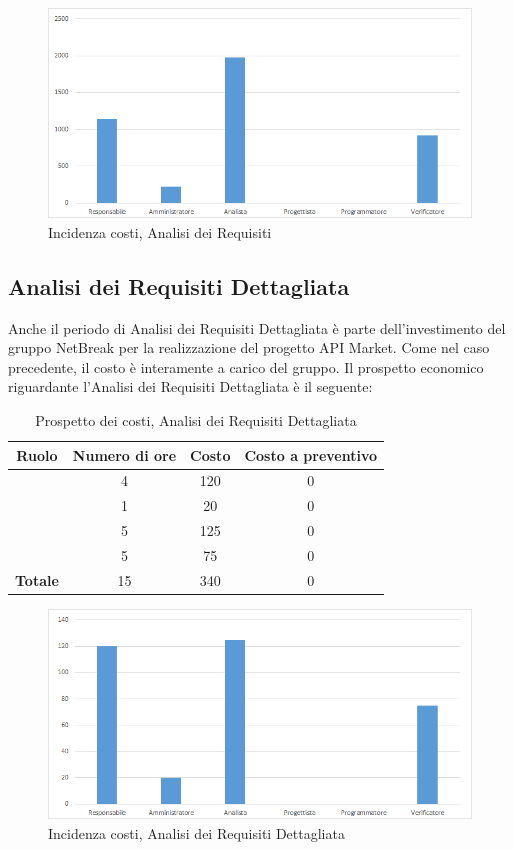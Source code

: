 \begin{figure}[H]
	\centering
	\includegraphics[scale=0.6]{img/8-1.png}
	\caption{Incidenza costi, Analisi dei Requisiti}
\end{figure}

\subsection{Analisi dei Requisiti Dettagliata}
Anche il periodo di Analisi dei Requisiti Dettagliata è parte dell'investimento del gruppo NetBreak per la realizzazione del progetto API Market. Come nel caso precedente, il costo è interamente a carico del gruppo. Il prospetto economico riguardante l'Analisi dei Requisiti Dettagliata è il seguente:


\begin{table}[H]
	\begin{center}
		\begin{tabular}{|c|c|c|c|}
			\hline
			\textbf{Ruolo}	& \textbf{Numero di ore} & \textbf{Costo} & \textbf{Costo a preventivo}\\
			\hline
			\Res	&	4  &	120 &  0	\\
			\hline
			\Amm	&	1  &	20 &  0	\\
			\hline
			\Ana	&	5  &	125 &  0	\\
			\hline
			\Ver	&	5  &	75	&  0	\\
			\hline
			\textbf{Totale}  &	15	&  340	 &  0	\\
			\hline
		\end{tabular}
	\end{center}
	\caption{Prospetto dei costi, Analisi dei Requisiti Dettagliata }
\end{table}

\begin{figure}[H]
	\centering
	\includegraphics[scale=0.6]{img/8-1a.png}
	\caption{Incidenza costi, Analisi dei Requisiti Dettagliata}
\end{figure}

